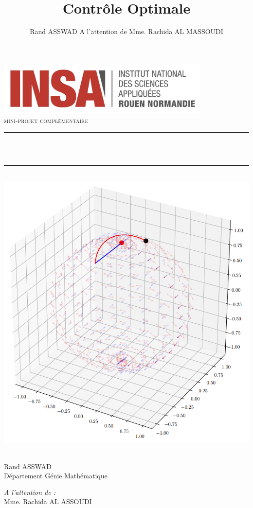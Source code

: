 \documentclass[
  french,
]{article}
\title{Contrôle Optimale}
\author{Rand ASSWAD
A l'attention de Mme. Rachida AL MASSOUDI}
\date{}
\newcommand{\HRule}{\rule{\linewidth}{0.5mm}}
\begin{document}
\maketitle

\begin{titlepage}
    \begin{sffamily}
        \begin{center}
            \includegraphics[width=0.8\textwidth]{img/logo}\\[2cm]

            \textsc{\huge mini-projet complémentaire}\\[1cm]

            \HRule \\[0.4cm]
            {\huge \bfseries \@title \\[0.4cm]}
            \HRule \\[1.5cm]

            \includegraphics[width=.5\textwidth]{img/cover_img}~\\[2cm]

            \begin{minipage}{0.4\textwidth}
            \begin{flushleft} \large
                Rand ASSWAD\\
                Département Génie Mathématique
            \end{flushleft}
            \end{minipage}
            \begin{minipage}{0.4\textwidth}
            \begin{flushright} \large
                \emph{A l'attention de :}\\
                Mme. Rachida AL ASSOUDI
            \end{flushright}
            \end{minipage}

            \vfill
            {\large \@date}
        \end{center}
    \end{sffamily}
\end{titlepage}
\makeatother
\end{document}
